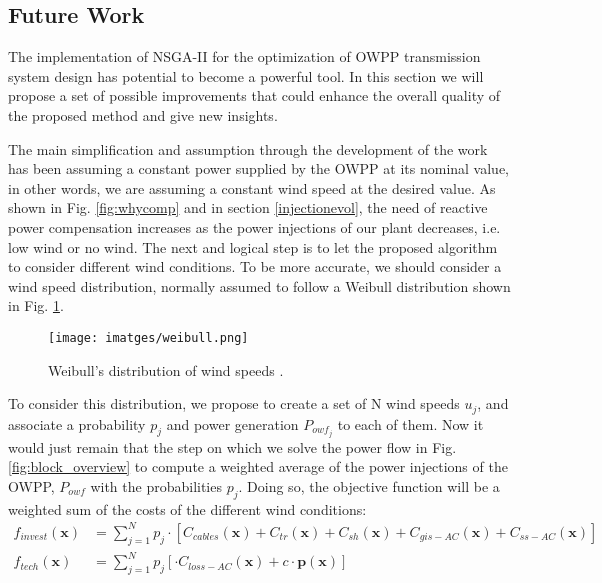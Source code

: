 \documentclass[a4paper,11pt, titlepage, twoside]{article}
\begin{document}
\subsection{Future Work}\label{futurework}

The implementation of NSGA-II for the optimization of OWPP transmission system design has potential to become a powerful tool. In this section we will propose a set of possible improvements
that could enhance the overall quality of the proposed method and give new insights.\par 

The main simplification and assumption through the development of the work has been assuming a constant power supplied by the OWPP
at its nominal value, in other words, we are assuming a constant wind speed at the desired value. As shown in Fig. \ref{fig:whycomp} and in section \ref{injectionevol}, the need of reactive power compensation increases as the power injections of our plant decreases, i.e. low wind or no wind.
The next and logical step is to let the proposed algorithm to consider different wind conditions. To be more accurate, we should consider a wind speed distribution, normally assumed to follow a Weibull distribution shown in Fig. \ref{fig:weibull}.

\begin{figure}[H]
    \centering
    \texttt{[image: imatges/weibull.png]}
    \caption{Weibull's distribution of wind speeds \cite{paperbase}.}
    \label{fig:weibull}
\end{figure}

To consider this distribution, we propose to create a set of N wind speeds $u_j$,  and associate a probability $p_j$ and power generation $P_{owf_j}$ to each of them. Now it would just remain that the step on which we solve the power flow in Fig. \ref{fig:block_overview} to compute a 
weighted average of the power injections of the OWPP, $P_{owf}$  with the probabilities $p_j$. Doing so, the objective function will be a weighted sum of the costs of the different wind conditions:
\begin{equation}
\begin{aligned}
        f_{invest}(\mathbf{x}) &= \sum_{j=1}^{N} p_j \cdot  \left[ C_{cables}(\mathbf{x}) + C_{tr}(\mathbf{x}) + C_{sh}(\mathbf{x}) + C_{gis-AC}(\mathbf{x}) + C_{ss-AC}(\mathbf{x}) \right] \\
        f_{tech}(\mathbf{x}) &= \sum_{j=1}^{N} p_j \left[ \cdot C_{loss-AC}(\mathbf{x}) + c \cdot \mathbf{p(x)} \right] \\       
\end{aligned}   
\end{equation}
\end{document}
